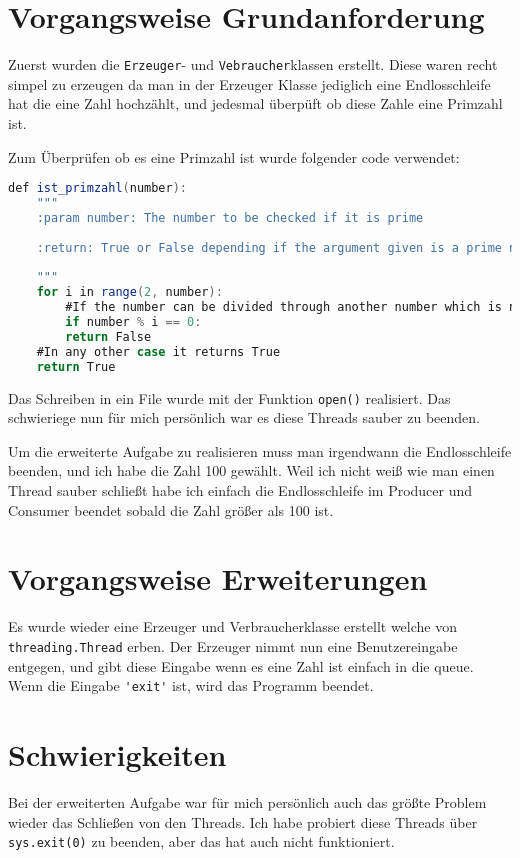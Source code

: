 
\section{Vorgangsweise Grundanforderung}
Zuerst wurden die \verb|Erzeuger|- und \verb|Vebraucher|klassen erstellt. Diese waren recht simpel zu erzeugen da man in der Erzeuger Klasse jediglich eine Endlosschleife hat die eine Zahl hochzählt, und jedesmal überpüft ob diese Zahle eine Primzahl ist.

Zum Überprüfen ob es eine Primzahl ist wurde folgender code verwendet:

\begin{lstlisting}[language=java]
def ist_primzahl(number):
	"""
	:param number: The number to be checked if it is prime
	
	:return: True or False depending if the argument given is a prime number
	
	"""
	for i in range(2, number):
		#If the number can be divided through another number which is not itself or 0 or 1 the method return False
		if number % i == 0:
		return False
	#In any other case it returns True
	return True
\end{lstlisting}

Das Schreiben in ein File wurde mit der Funktion \verb|open()| realisiert. Das schwieriege nun für mich persönlich war es diese Threads sauber zu beenden.

Um die erweiterte Aufgabe zu realisieren muss man irgendwann die Endlosschleife beenden, und ich habe die Zahl 100 gewählt. Weil ich nicht weiß wie man einen Thread sauber schließt habe ich einfach die Endlosschleife im Producer und Consumer beendet sobald die Zahl größer als 100 ist.



\section{Vorgangsweise Erweiterungen}
Es wurde wieder eine Erzeuger und Verbraucherklasse erstellt welche von \verb|threading.Thread| erben. Der Erzeuger nimmt nun eine Benutzereingabe entgegen, und gibt diese Eingabe wenn es eine Zahl ist einfach in die queue. Wenn die Eingabe \verb|'exit'| ist, wird das Programm beendet. 




\section{Schwierigkeiten}
Bei der erweiterten Aufgabe war für mich persönlich auch das größte Problem wieder das Schließen von den Threads. Ich habe probiert diese Threads über \verb|sys.exit(0)| zu beenden, aber das hat auch nicht funktioniert.

